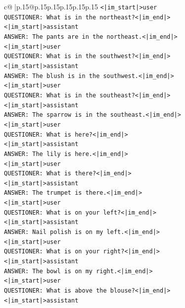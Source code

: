 \documentclass{article}
\begin{document}
{\begin{supertabular}{c@{$\;$}|p{.15\linewidth}@{}p{.15\linewidth}p{.15\linewidth}p{.15\linewidth}p{.15\linewidth}p{.15\linewidth}}
{{{\texttt{<|im\_start|>user} \\
\texttt{QUESTIONER: What is in the northeast?<|im\_end|>} \\
\texttt{<|im\_start|>assistant} \\
\texttt{ANSWER: The pants are in the northeast.<|im\_end|>} \\
\texttt{<|im\_start|>user} \\
\texttt{QUESTIONER: What is in the southwest?<|im\_end|>} \\
\texttt{<|im\_start|>assistant} \\
\texttt{ANSWER: The blush is in the southwest.<|im\_end|>} \\
\texttt{<|im\_start|>user} \\
\texttt{QUESTIONER: What is in the southeast?<|im\_end|>} \\
\texttt{<|im\_start|>assistant} \\
\texttt{ANSWER: The sparrow is in the southeast.<|im\_end|>} \\
\texttt{<|im\_start|>user} \\
\texttt{QUESTIONER: What is here?<|im\_end|>} \\
\texttt{<|im\_start|>assistant} \\
\texttt{ANSWER: The lily is here.<|im\_end|>} \\
\texttt{<|im\_start|>user} \\
\texttt{QUESTIONER: What is there?<|im\_end|>} \\
\texttt{<|im\_start|>assistant} \\
\texttt{ANSWER: The trumpet is there.<|im\_end|>} \\
\texttt{<|im\_start|>user} \\
\texttt{QUESTIONER: What is on your left?<|im\_end|>} \\
\texttt{<|im\_start|>assistant} \\
\texttt{ANSWER: Nail polish is on my left.<|im\_end|>} \\
\texttt{<|im\_start|>user} \\
\texttt{QUESTIONER: What is on your right?<|im\_end|>} \\
\texttt{<|im\_start|>assistant} \\
\texttt{ANSWER: The bowl is on my right.<|im\_end|>} \\
\texttt{<|im\_start|>user} \\
\texttt{QUESTIONER: What is above the blouse?<|im\_end|>} \\
\texttt{<|im\_start|>assistant} \\
}}}
\end{supertabular}}
\end{document}
